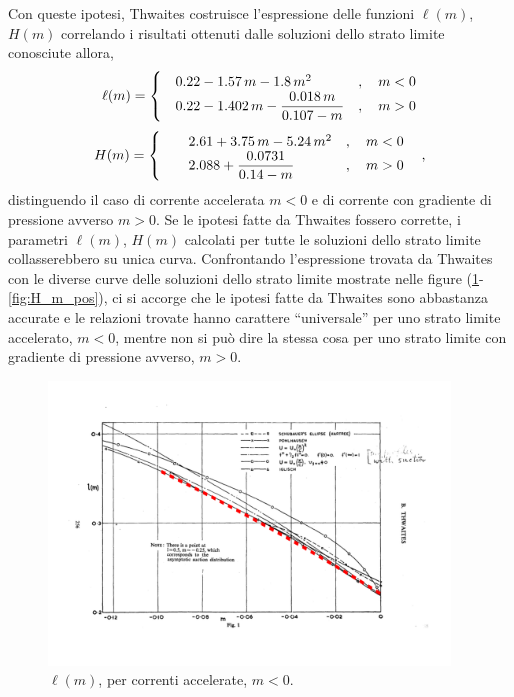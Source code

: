 \noindent
Con queste ipotesi, Thwaites costruisce l'espressione delle funzioni $\ell(m)$, $H(m)$ correlando i risultati ottenuti dalle soluzioni dello strato limite conosciute allora,
\begin{equation}
\ell(m) = 
\begin{cases}
 & 0.22 - 1.57  \, m - 1.8 \, m^2                  \hfill \quad  , \quad m < 0 \\
 & 0.22 - 1.402 \, m - \dfrac{0.018 \, m}{0.107-m} \hfill \quad  , \quad m > 0 \\
\end{cases}
\end{equation}
\begin{equation}
H(m) =
\begin{cases}
 & \quad 2.61  + 3.75 \, m - 5.24 \, m^2 \hfill \quad , \quad m < 0 \\
 & \quad 2.088 + \dfrac{0.0731}{0.14-m}  \hfill \quad , \quad m > 0 \\
\end{cases} \quad , 
\end{equation}
distinguendo il caso di corrente accelerata $m < 0$ e di corrente con gradiente di pressione avverso $m > 0$. Se le ipotesi fatte da Thwaites fossero corrette, i parametri $\ell(m)$, $H(m)$ calcolati per tutte le soluzioni dello strato limite collasserebbero su unica curva. Confrontando l'espressione trovata da Thwaites con le diverse curve delle soluzioni dello strato limite mostrate nelle figure (\ref{fig:ell_m_neg}-\ref{fig:H_m_pos}), ci si accorge che le ipotesi fatte da Thwaites sono abbastanza accurate e le relazioni trovate hanno carattere ``universale'' per uno strato limite accelerato, $m<0$, mentre non si può dire la stessa cosa per uno strato limite con gradiente di pressione avverso, $m>0$.

\begin{figure}[h!]
\centering
 \includegraphics[width=0.95\textwidth, trim= 0  60 0  50, clip]{./../template/fig/cfr_ell_m_neg}
\caption{$\ell(m)$, per correnti accelerate, $m<0$.}\label{fig:ell_m_neg}
\end{figure}

